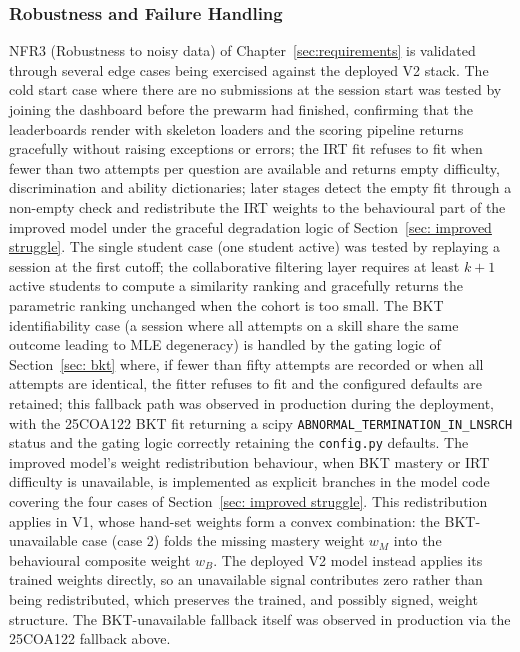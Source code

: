 \subsubsection{Robustness and Failure Handling} \label{sec:eval-robustness}
NFR3 (Robustness to noisy data) of Chapter~\ref{sec:requirements} is validated through several edge cases being exercised against the deployed V2 stack.
The cold start case where there are no submissions at the session start was tested by joining the dashboard before the prewarm had finished, confirming that the leaderboards render with skeleton loaders and the scoring pipeline returns gracefully without raising exceptions or errors; the IRT fit refuses to fit when fewer than two attempts per question are available and returns empty difficulty, discrimination and ability dictionaries; later stages detect the empty fit through a non-empty check and redistribute the IRT weights to the behavioural part of the improved model under the graceful degradation logic of Section~\ref{sec: improved struggle}.
The single student case (one student active) was tested by replaying a session at the first cutoff; the collaborative filtering layer requires at least $k+1$ active students to compute a similarity ranking and gracefully returns the parametric ranking unchanged when the cohort is too small.
The BKT identifiability case (a session where all attempts on a skill share the same outcome leading to MLE degeneracy) is handled by the gating logic of Section~\ref{sec: bkt} where, if fewer than fifty attempts are recorded or when all attempts are identical, the fitter refuses to fit and the configured defaults are retained; this fallback path was observed in production during the deployment, with the 25COA122 BKT fit returning a scipy \texttt{ABNORMAL\_TERMINATION\_IN\_LNSRCH} status and the gating logic correctly retaining the \texttt{config.py} defaults.
The improved model's weight redistribution behaviour, when BKT mastery or IRT difficulty is unavailable, is implemented as explicit branches in the model code covering the four cases of Section~\ref{sec: improved struggle}. This redistribution applies in V1, whose hand-set weights form a convex combination: the BKT-unavailable case (case 2) folds the missing mastery weight $w_M$ into the behavioural composite weight $w_B$. The deployed V2 model instead applies its trained weights directly, so an unavailable signal contributes zero rather than being redistributed, which preserves the trained, and possibly signed, weight structure. The BKT-unavailable fallback itself was observed in production via the 25COA122 fallback above.
